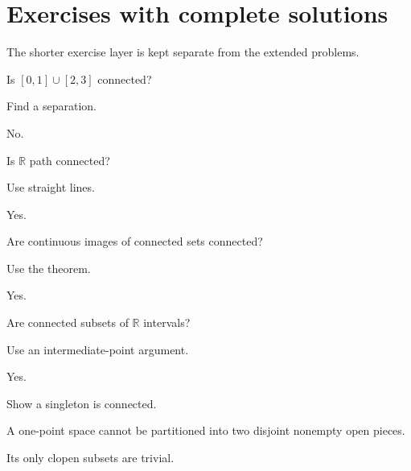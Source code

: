 \section{Exercises with complete solutions}
The shorter exercise layer is kept separate from the extended problems.

\begin{exercise}\label{exr:ii07-01}
Is $[0,1]\cup[2,3]$ connected?
\end{exercise}
\begin{hint}
Find a separation.
\end{hint}
\begin{solution}
No.
\end{solution}

\begin{exercise}\label{exr:ii07-02}
Is $\mathbb R$ path connected?
\end{exercise}
\begin{hint}
Use straight lines.
\end{hint}
\begin{solution}
Yes.
\end{solution}

\begin{exercise}\label{exr:ii07-03}
Are continuous images of connected sets connected?
\end{exercise}
\begin{hint}
Use the theorem.
\end{hint}
\begin{solution}
Yes.
\end{solution}

\begin{exercise}\label{exr:ii07-04}
Are connected subsets of $\mathbb R$ intervals?
\end{exercise}
\begin{hint}
Use an intermediate-point argument.
\end{hint}
\begin{solution}
Yes.
\end{solution}

\begin{exercise}\label{exr:ii07-05}
Show a singleton is connected.
\end{exercise}
\begin{hint}
A one-point space cannot be partitioned into two disjoint nonempty open pieces.
\end{hint}
\begin{solution}
Its only clopen subsets are trivial.
\end{solution}

